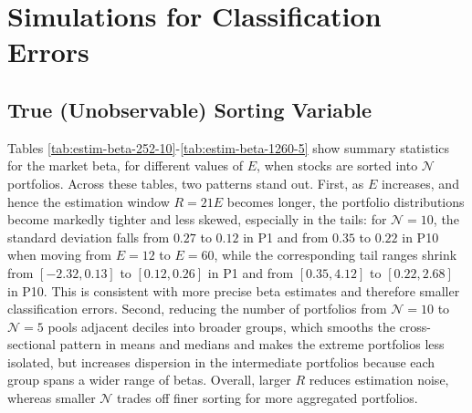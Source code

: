 \section{Simulations for Classification Errors}
\label{app:Simulations for Classification Errors}

\subsection{True (Unobservable) Sorting Variable}
\label{app:True (Unobservable) Sorting Variable}

Tables \ref{tab:estim-beta-252-10}-\ref{tab:estim-beta-1260-5} show summary statistics for the market beta, for different values of $E$, when stocks are sorted into $\mathcal{N}$ portfolios. Across these tables, two patterns stand out. First, as $E$ increases, and hence the estimation window $R=21E$ becomes longer, the portfolio distributions become markedly tighter and less skewed, especially in the tails: for $\mathcal{N}=10$, the standard deviation falls from $0.27$ to $0.12$ in P1 and from $0.35$ to $0.22$ in P10 when moving from $E=12$ to $E=60$, while the corresponding tail ranges shrink from $[-2.32,0.13]$ to $[0.12,0.26]$ in P1 and from $[0.35,4.12]$ to $[0.22,2.68]$ in P10. This is consistent with more precise beta estimates and therefore smaller classification errors. Second, reducing the number of portfolios from $\mathcal{N}=10$ to $\mathcal{N}=5$ pools adjacent deciles into broader groups, which smooths the cross-sectional pattern in means and medians and makes the extreme portfolios less isolated, but increases dispersion in the intermediate portfolios because each group spans a wider range of betas. Overall, larger $R$ reduces estimation noise, whereas smaller $\mathcal{N}$ trades off finer sorting for more aggregated portfolios.

 

 

 

 

 

 

